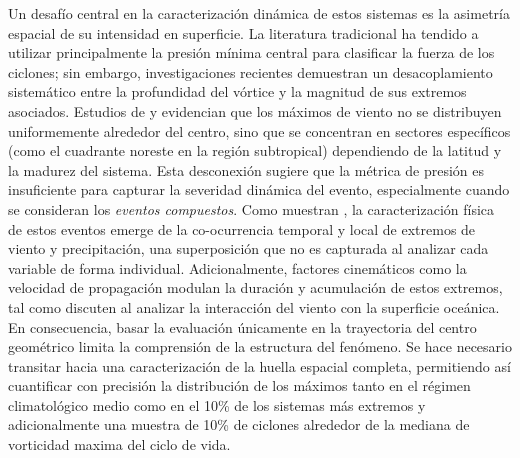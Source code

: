 
Un desafío central en la caracterización dinámica de estos sistemas es la asimetría espacial de su intensidad en superficie. La literatura tradicional ha tendido a utilizar principalmente la presión mínima central para clasificar la fuerza de los ciclones; sin embargo, investigaciones recientes demuestran un desacoplamiento sistemático entre la profundidad del vórtice y la magnitud de sus extremos asociados. Estudios de \citet{bitencourt2010relating} y \citet{cardoso2022synoptic} evidencian que los máximos de viento no se distribuyen uniformemente alrededor del centro, sino que se concentran en sectores específicos (como el cuadrante noreste en la región subtropical) dependiendo de la latitud y la madurez del sistema.
Esta desconexión sugiere que la métrica de presión es insuficiente para capturar la severidad dinámica del evento, especialmente cuando se consideran los \textit{eventos compuestos}. Como muestran \citet{chen2025characteristics}, la caracterización física de estos eventos emerge de la co-ocurrencia temporal y local de extremos de viento y precipitación, una superposición que no es capturada al analizar cada variable de forma individual.
Adicionalmente, factores cinemáticos como la velocidad de propagación modulan la duración y acumulación de estos extremos, tal como discuten \citet{gramcianinov2023impact} al analizar la interacción del viento con la superficie oceánica.
En consecuencia, basar la evaluación únicamente en la trayectoria del centro geométrico limita la comprensión de la estructura del fenómeno. Se hace necesario transitar hacia una caracterización de la huella espacial completa, permitiendo así cuantificar con precisión la distribución de los máximos tanto en el régimen climatológico medio como en el 10\% de los sistemas más extremos y adicionalmente una muestra de 10\% de ciclones alrededor de la mediana de vorticidad maxima del ciclo de vida.


